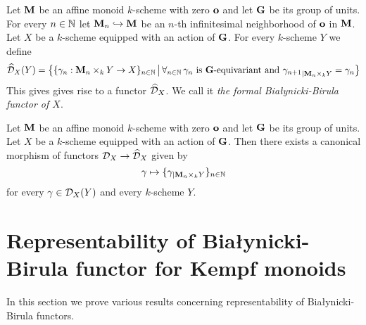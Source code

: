 \begin{definition}
Let $\mathbf{M}$ be an affine monoid $k$-scheme with zero $\mathbf{o}$ and let $\mathbf{G}$ be its group of units. For every $n\in {\mathbb N}$ let $\mathbf{M}_n\hookrightarrow \mathbf{M}$ be an $n$-th infinitesimal neighborhood of $\mathbf{o}$ in $\mathbf{M}$. Let $X$ be a $k$-scheme equipped with an action of $\mathbf{G}$. For every $k$-scheme $Y$ we define
$$\widehat{{\mathcal D}}_X(Y) = \big\{\{\gamma_n:\mathbf{M}_n\times_kY\rightarrow X\}_{n\in {\mathbb N}}\,\big|\,\forall_{n\in {\mathbb N}}\,\gamma_n\mbox{ is }\mathbf{G}\mbox{-equivariant and }{\gamma_{n+1}}_{\mid \mathbf{M}_n\times_kY} = \gamma_n\big\}$$
This gives gives rise to a functor $\widehat{{\mathcal D}}_X$. We call it \textit{the formal Bia{\l}ynicki-Birula functor of $X$}.
\end{definition}

\begin{remark}
Let $\mathbf{M}$ be an affine monoid $k$-scheme with zero $\mathbf{o}$ and let $\mathbf{G}$ be its group of units. Let $X$ be a $k$-scheme equipped with an action of $\mathbf{G}$. Then there exists a canonical morphism of functors ${\mathcal D}_X\rightarrow \widehat{{\mathcal D}}_X$ given by
$$\gamma \mapsto \{\gamma_{\mid \mathbf{M}_n\times_kY}\}_{n\in {\mathbb N}}$$
for every $\gamma \in {\mathcal D}_X(Y)$ and every $k$-scheme $Y$.
\end{remark}

\section{Representability of Bia{\l}ynicki-Birula functor for Kempf monoids}
\noindent
In this section we prove various results concerning representability of Bia{\l}ynicki-Birula functors.

